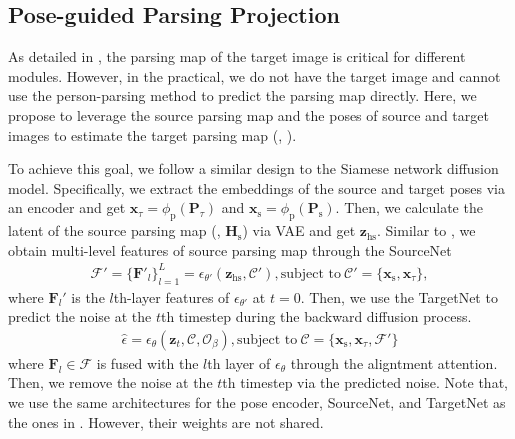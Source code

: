 


\subsection{Pose-guided Parsing Projection}
\label{subsec: parsing projection}

As detailed in , the parsing map of the target image is critical for different modules. 
%
However, in the practical, we do not have the target image and cannot use the person-parsing method to predict the parsing map directly.
%
Here, we propose to leverage the source parsing map and the poses of source and target images to estimate the target parsing map (\ie, ).
%

To achieve this goal, we follow a similar design to the Siamese network diffusion model. Specifically, we extract the embeddings of the source and target poses via an encoder and get $\mathbf{x}_\tau = \phi_\text{p}(\mathbf{P}_\tau)$ and $\mathbf{x}_\text{s} = \phi_\text{p}(\mathbf{P}_\text{s})$. Then, we calculate the latent of the source parsing map (\ie, $\mathbf{H}_\text{s}$) via VAE and get $\mathbf{z}_\text{hs}$.
%
Similar to , we obtain multi-level features of source parsing map through the SourceNet
%
\begin{align} \label{eq:sourcenet_ppp}
    \mathcal{F}' = \{\mathbf{F}'_l\}_{l=1}^L = \epsilon_{\theta'}(\mathbf{z}_\text{hs},\mathcal{C}'), \text{subject to}~\mathcal{C}'=\{\mathbf{x}_\text{s},\mathbf{x}_\tau\},
\end{align}
%
where $\mathbf{F}_l'$ is the $l$th-layer features of $ \epsilon_{\theta'}$ at $t=0$. Then, we use the TargetNet to predict the noise at the $t$th timestep during the backward diffusion process.
%
\begin{align} \label{eq:targetnet_ppp}
      \hat{\epsilon} = \epsilon_{\theta} (\mathbf{z}_t,\mathcal{C},
      \mathcal{O}_\beta), \text{subject to}~\mathcal{C}=\{\mathbf{x}_\text{s},\mathbf{x}_\tau, \mathcal{F}'\}
\end{align}
%
where $\mathbf{F}_l\in \mathcal{F}$ is fused with the $l$th layer of $\epsilon_{\theta}$ through the aligntment attention.
%
Then, we remove the noise at the $t$th timestep via the predicted noise. 
%
Note that, we use the same architectures for the pose encoder, SourceNet, and TargetNet as the ones in . However, their weights are not shared.


